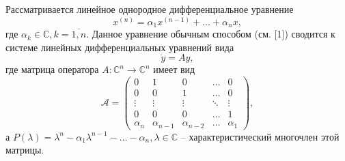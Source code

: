 Рассматривается линейное однородное дифференциальное уравнение
$$
	x^{(n)} = \alpha_{1}x^{(n-1)} + \ldots + \alpha_{n}x, 
$$
где $\alpha_{k} \in \mathbb{C}, k = \overline{1,n}$. Данное уравнение обычным способом (см. [1]) сводится к системе
линейных дифференциальных уравнений вида
$$
	\dot{y} = Ay,
$$
где матрица оператора $A: \mathbb{C}^n \to \mathbb{C}^n$ имеет вид
$$
	\mathcal{A} = \begin{pmatrix}
		0 & 1 & 0 & \dots & 0 \\
		0 & 0 & 1 & \dots & 0 \\
		\vdots & \vdots & \vdots & \ddots & \vdots \\
		0 & 0 & 0 & \dots & 1 \\
		\alpha_n & \alpha_{n-1} & \alpha_{n-2} & \dots & \alpha_1
	\end{pmatrix},
$$
а $P(\lambda) = \lambda^{n} - \alpha_{1}\lambda^{n-1} - \ldots - \alpha_{n}, \lambda \in \mathbb{C}$ -- характеристический многочлен этой матрицы.